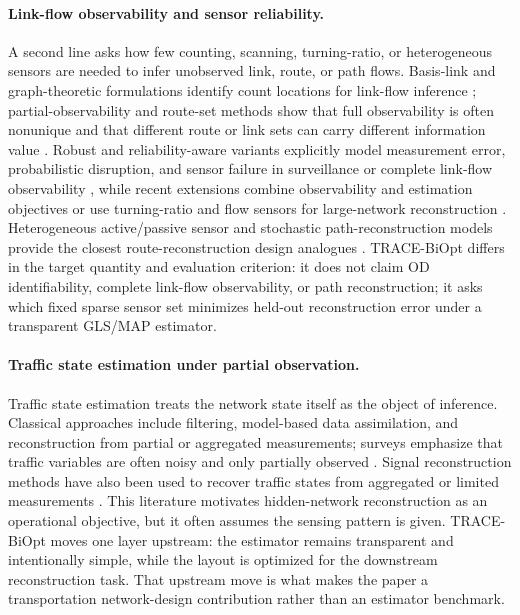 \paragraph{Link-flow observability and sensor reliability.}
A second line asks how few counting, scanning, turning-ratio, or heterogeneous
sensors are needed to infer unobserved link, route, or path flows.  Basis-link
and graph-theoretic formulations identify count locations for link-flow
inference \citep{hu2009identification,he2013graphical,ng2012synergistic};
partial-observability and route-set methods show that full observability is
often nonunique and that different route or link sets can carry different
information value
\citep{viti2014partial,rinaldi2017route,zhuo2024revisiting}.  Robust and
reliability-aware variants explicitly model measurement error, probabilistic
disruption, and sensor failure in surveillance or complete link-flow
observability
\citep{li2011reliable,li2012opre,xu2016robust,salari2019failure,yu2023robustness},
while recent extensions combine observability and estimation objectives or use
turning-ratio and flow sensors for large-network reconstruction
\citep{zhu2022nslp,rodriguez2019turning}.  Heterogeneous active/passive sensor
and stochastic path-reconstruction models provide the closest
route-reconstruction design analogues
\citep{fu2016heterogeneous,fu2017stochastic}.  TRACE-BiOpt differs in the
target quantity and evaluation criterion: it does not claim OD identifiability,
complete link-flow observability, or path reconstruction; it asks which fixed
sparse sensor set minimizes held-out reconstruction error under a transparent
GLS/MAP estimator.


\FloatBarrier

\paragraph{Traffic state estimation under partial observation.}
Traffic state estimation treats the network state itself as the object of
inference.  Classical approaches include filtering, model-based data
assimilation, and reconstruction from partial or aggregated measurements;
surveys emphasize that traffic variables are often noisy and only partially
observed \citep{seo2017survey}.  Signal reconstruction methods have also been
used to recover traffic states from aggregated or limited measurements
\citep{coric2012traffic}.  This literature motivates hidden-network
reconstruction as an operational objective, but it often assumes the sensing
pattern is given.  TRACE-BiOpt moves one layer upstream: the estimator remains
transparent and intentionally simple, while the layout is optimized for the
downstream reconstruction task.  That upstream move is what makes the paper a
transportation network-design contribution rather than an estimator benchmark.

